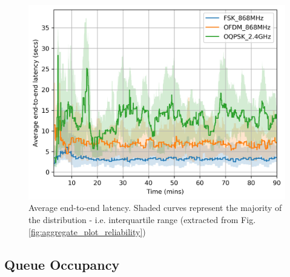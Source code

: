 \documentclass[journal]{IEEEtran}
\begin{document}


\begin{figure}
	\centering
	\includegraphics[width=0.90\columnwidth]{avg_latency_plot}
	\caption{Average end-to-end latency. Shaded curves represent the majority of the distribution - i.e. interquartile range (extracted from Fig. \ref{fig:aggregate_plot_reliability})}
    \label{fig:avg_latency_plot}
\end{figure}

\subsection{Queue Occupancy}
\label{sec:queue}




\end{document}
